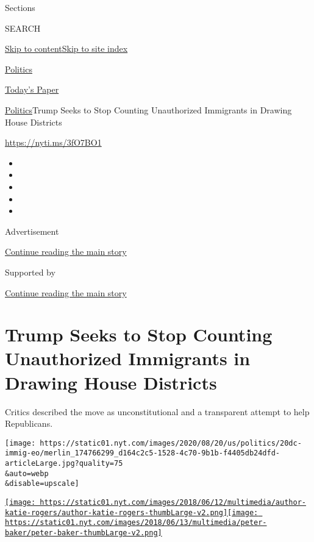 Sections

SEARCH

\protect\hyperlink{site-content}{Skip to
content}\protect\hyperlink{site-index}{Skip to site index}

\href{https://www.nytimes.com/section/politics}{Politics}

\href{https://myaccount.nytimes.com/auth/login?response_type=cookie\&client_id=vi}{}

\href{https://www.nytimes.com/section/todayspaper}{Today's Paper}

\href{/section/politics}{Politics}\textbar{}Trump Seeks to Stop Counting
Unauthorized Immigrants in Drawing House Districts

\url{https://nyti.ms/3fO7BO1}

\begin{itemize}
\item
\item
\item
\item
\item
\end{itemize}

Advertisement

\protect\hyperlink{after-top}{Continue reading the main story}

Supported by

\protect\hyperlink{after-sponsor}{Continue reading the main story}

\hypertarget{trump-seeks-to-stop-counting-unauthorized-immigrants-in-drawing-house-districts}{%
\section{Trump Seeks to Stop Counting Unauthorized Immigrants in Drawing
House
Districts}\label{trump-seeks-to-stop-counting-unauthorized-immigrants-in-drawing-house-districts}}

Critics described the move as unconstitutional and a transparent attempt
to help Republicans.

\texttt{[image: https://static01.nyt.com/images/2020/08/20/us/politics/20dc-immig-eo/merlin\_174766299\_d164c2c5-1528-4c70-9b1b-f4405db24dfd-articleLarge.jpg?quality=75\\\&auto=webp\\\&disable=upscale]}

\href{https://www.nytimes.com/by/katie-rogers}{\texttt{[image: https://static01.nyt.com/images/2018/06/12/multimedia/author-katie-rogers/author-katie-rogers-thumbLarge-v2.png]}}\href{https://www.nytimes.com/by/peter-baker}{\texttt{[image: https://static01.nyt.com/images/2018/06/13/multimedia/peter-baker/peter-baker-thumbLarge-v2.png]}}

